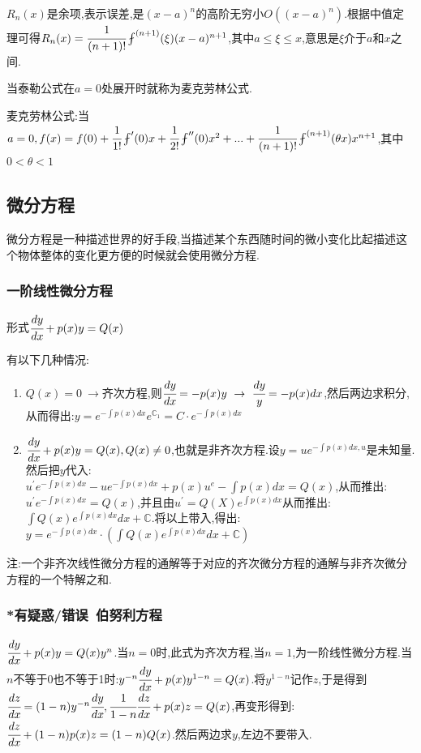 \documentclass[UTF8,12pt]{ctexbook}
\newcommand{\derivative}{^\prime}
\newcommand{\doubleDerivative}{^{\prime\prime}}
\newcommand{\aLotDerivative}[1]{^{(#1)}}
\newcommand{\fDerivative}[1]{\fint\derivative(#1)}
\newcommand{\defFunction}[1]{f(#1)}
\newcommand{\mathConstant}{\mathbb{C}}
\begin{document}
{{{{$R_n(x)$是余项,表示误差,是$(x - a)^n$的高阶无穷小$O((x - a)^n)$.根据中值定理可得$R_n(x) = \cfrac{1}{(n + 1)!}\fint\aLotDerivative{n + 1}(\xi)(x - a)^{n+1}$,其中$a \leq \xi \leq x$,意思是$\xi$介于$a$和$x$之间.

当泰勒公式在$a = 0$处展开时就称为麦克劳林公式.

麦克劳林公式:当$a = 0, \defFunction{x} = \defFunction{0} + \cfrac{1}{1!}\fDerivative{0}x + \cfrac{1}{2!}\fint\doubleDerivative(0)x^2 + ... + \cfrac{1}{(n + 1)!}\fint\aLotDerivative{n + 1}(\theta x)x^{n+1}$,其中$0 < \theta < 1$

}%

}%

\subsection{微分方程}{
微分方程是一种描述世界的好手段,当描述某个东西随时间的微小变化比起描述这个物体整体的变化更方便的时候就会使用微分方程.

\subsubsection{一阶线性微分方程}{
  形式$\cfrac{dy}{dx} + p(x)y = Q(x)$

  有以下几种情况:
  \begin{enumerate}
    \item $Q(x) = 0\ \to$齐次方程,则$\cfrac{dy}{dx} = -p(x)y\ \to \ \cfrac{dy}{y} = -p(x)dx$,然后两边求积分,从而得出:$y = e^{-\int p(x)dx}e^{\mathConstant_1} = C \cdot e^{-\int p(x)dx}$
    \item $\cfrac{dy}{dx} + p(x)y = Q(x), Q(x) \neq 0$,也就是非齐次方程.设$y = ue^{-\int p(x)dx, u}$是未知量.然后把$y$代入:\\ $u\derivative e^{-\int p(x)dx} - ue^{-\int p(x)dx} + p(x)u^{e}-\int p(x)dx = Q(x)$,从而推出:$u\derivative e^{-\int p(x)dx} = Q(x)$,并且由$u\derivative = Q(X)e^{\int p(x)dx}$从而推出:$\int Q(x)e^{\int p(x)dx}dx + \mathConstant$.将以上带入,得出:$y = e^{-\int p(x)dx}\cdot(\int Q(x)e^{\int p(x)dx}dx + \mathConstant)$
  \end{enumerate}

  注:一个非齐次线性微分方程的通解等于对应的齐次微分方程的通解与非齐次微分方程的一个特解之和.

}%

\subsubsection{*有疑惑/错误\ 伯努利方程}{
  $\cfrac{dy}{dx} + p(x)y = Q(x)y^n$.当$n = 0$时,此式为齐次方程,当$n = 1$,为一阶线性微分方程.当$n$不等于0也不等于1时:$y^{-n}\cfrac{dy}{dx} + p(x)y^{1-n} = Q(x)$.将$y^{1-n}$记作$z$,于是得到$\cfrac{dz}{dx} = (1-n)y^{-n}\cfrac{dy}{dx},\cfrac{1}{1-n}\cfrac{dz}{dx} + p(x)z = Q(x)$,再变形得到:$\cfrac{dz}{dx} + (1-n)p(x)z = (1-n)Q(x)$.然后两边求$y$,左边不要带入.

}}}}
\end{document}
